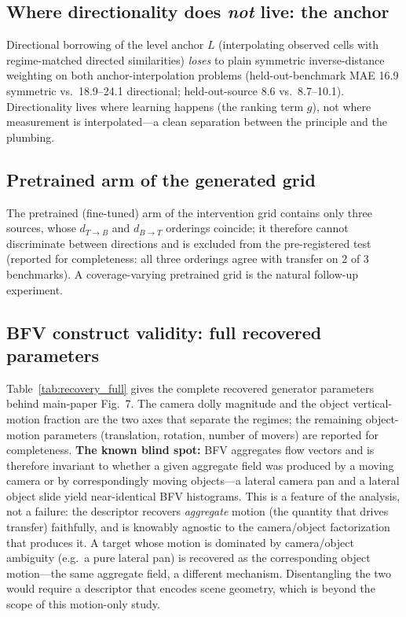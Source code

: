 \documentclass[runningheads]{llncs}
\newcommand{\dtb}{d_{T\to B}}
\newcommand{\dbt}{d_{B\to T}}
\begin{document}
\begin{table}[h]
\centering
\caption{Per-regime linear model under different feature sets. MAE is
held-out-source, anchor $+$ model.}
\label{tab:supp_featuresets}
\scriptsize
\setlength{\tabcolsep}{3.5pt}

\end{table}

\subsection{Where directionality does \emph{not} live: the anchor}
Directional borrowing of the level anchor $L$ (interpolating observed cells
with regime-matched directed similarities) \emph{loses} to plain symmetric
inverse-distance weighting on both anchor-interpolation problems
(held-out-benchmark MAE 16.9 symmetric vs.\ 18.9--24.1 directional;
held-out-source 8.6 vs.\ 8.7--10.1). Directionality lives where learning
happens (the ranking term $g$), not where measurement is interpolated---a
clean separation between the principle and the plumbing.

\subsection{Pretrained arm of the generated grid}
The pretrained (fine-tuned) arm of the intervention grid contains only three
sources, whose $\dtb$ and $\dbt$ orderings coincide; it therefore cannot
discriminate between directions and is excluded from the pre-registered test
(reported for completeness: all three orderings agree with transfer on 2 of
3 benchmarks). A coverage-varying pretrained grid is the natural follow-up
experiment.

\subsection{BFV construct validity: full recovered parameters}
Table~\ref{tab:recovery_full} gives the complete recovered generator
parameters behind main-paper Fig.~7. The camera dolly magnitude and the object
vertical-motion fraction are the two axes that separate the regimes; the
remaining object-motion parameters (translation, rotation, number of movers)
are reported for completeness. \textbf{The known blind spot:} BFV aggregates
flow vectors and is therefore invariant to whether a given aggregate field was
produced by a moving camera or by correspondingly moving objects---a lateral
camera pan and a lateral object slide yield near-identical BFV histograms. This
is a feature of the analysis, not a failure: the descriptor recovers
\emph{aggregate} motion (the quantity that drives transfer) faithfully, and is
knowably agnostic to the camera/object factorization that produces it. A
target whose motion is dominated by camera/object ambiguity (e.g.\ a pure
lateral pan) is recovered as the corresponding object motion---the same
aggregate field, a different mechanism. Disentangling the two would require a
descriptor that encodes scene geometry, which is beyond the scope of this
motion-only study.
\end{document}
